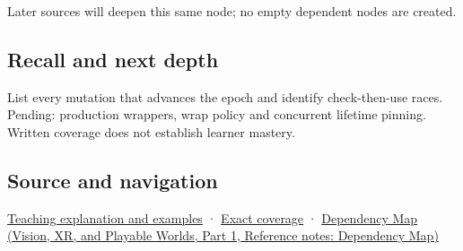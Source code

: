 Later sources will deepen this same node; no empty dependent nodes are created.

\subsection{Recall and next depth}\label{appendix-aa405b7c3903-recall-and-next-depth}

\hypertarget{appendix-aa405b7c3903-recall-and-next-depth}{}

List every mutation that advances the epoch and identify check-then-use races. Pending: production wrappers, wrap policy and concurrent lifetime pinning. Written coverage does not establish learner mastery.

\subsection{Source and navigation}\label{appendix-aa405b7c3903-source-and-navigation}

\hypertarget{appendix-aa405b7c3903-source-and-navigation}{}

\hyperref[01-foundations-i-ch003-when-a-valid-borrow-stops-naming-the-intended-thing]{Teaching explanation and examples} · \hyperref[appendix-fd090d982a15-m008---parts-113-126]{Exact coverage} · \href{../07-Vision-XR-and-Playable-Worlds-P01/main.pdf\#nameddest=appendix-4ad47bdd269a}{Dependency Map (Vision, XR, and Playable Worlds, Part 1, Reference notes: Dependency Map)}
